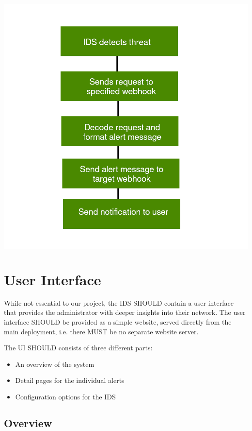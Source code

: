 \documentclass[oneside, english]{reports/assets/sdqtechreport}
\begin{document}
\begin{center}
	\includegraphics{alert-workflow}
\end{center}

\chapter{User Interface}
\label{chap:UserInterface}

While not essential to our project, the IDS SHOULD contain a user interface
that provides the administrator with deeper insights into their network. The
user interface SHOULD be provided as a simple website, served directly from
the main deployment, i.e. there MUST be no separate website server.

The UI SHOULD consists of three different parts:
\begin{itemize}
	\item An overview of the system
	\item Detail pages for the individual alerts
	\item Configuration options for the IDS
\end{itemize}

\section{Overview}
\label{sec:UserInterfaceOverview}
\end{document}
